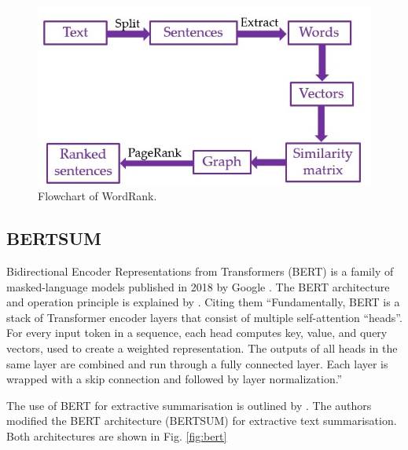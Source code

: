 \documentclass[11pt]{article}
\begin{document}
\begin{figure}[!h]
\centering
\includegraphics[scale = 0.5]{../figures/wordrank.jpg}
\caption{Flowchart of WordRank.\label{fig:wordrank}}
\end{figure}

\subsection{BERTSUM}

Bidirectional Encoder Representations from Transformers (BERT) is a family of masked-language models published in 2018 by Google \citep{devlin2019google}. The BERT architecture and operation principle is explained by \citet{rogers2021primer}. Citing them ``Fundamentally, BERT is a stack of Transformer encoder layers that consist of multiple self-attention “heads”. For every input token in a sequence, each head computes key, value, and query vectors, used to create a weighted representation. The outputs of all heads in the same layer are combined and run through a fully connected layer. Each layer is wrapped with a skip connection and followed by layer normalization.''

The use of BERT for extractive summarisation is outlined by \citet{liu2019text}. The authors modified the BERT architecture (BERTSUM) for extractive text summarisation. Both architectures are shown in Fig. \ref{fig:bert}
\end{document}
